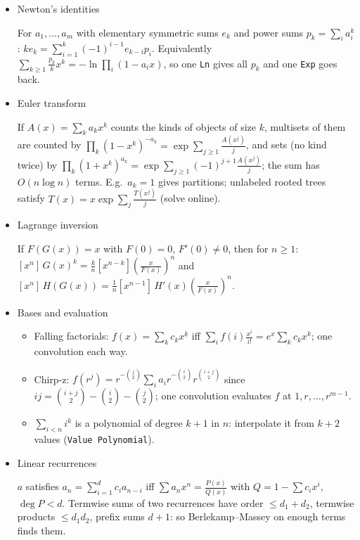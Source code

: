 \begin{itemize}
\item Newton's identities

For $a_1, \ldots, a_m$ with elementary symmetric sums $e_k$ and power sums $p_k = \sum_i a_i^k$: $k e_k = \sum_{i=1}^{k} (-1)^{i-1} e_{k-i} p_i$. Equivalently $\sum_{k \ge 1} \frac{p_k}{k} x^k = -\ln \prod_i (1 - a_i x)$, so one \texttt{Ln} gives all $p_k$ and one \texttt{Exp} goes back.

\item Euler transform

If $A(x) = \sum_k a_k x^k$ counts the kinds of objects of size $k$, multisets of them are counted by $\prod_k (1 - x^k)^{-a_k} = \exp \sum_{j \ge 1} \frac{A(x^j)}{j}$, and sets (no kind twice) by $\prod_k (1 + x^k)^{a_k} = \exp \sum_{j \ge 1} (-1)^{j+1} \frac{A(x^j)}{j}$; the sum has $O(n \log n)$ terms. E.g.\ $a_k = 1$ gives partitions; unlabeled rooted trees satisfy $T(x) = x \exp \sum_j \frac{T(x^j)}{j}$ (solve online).

\item Lagrange inversion

If $F(G(x)) = x$ with $F(0) = 0$, $F'(0) \ne 0$, then for $n \ge 1$: $[x^n]\, G(x)^k = \frac{k}{n} [x^{n-k}] \left(\frac{x}{F(x)}\right)^n$ and $[x^n]\, H(G(x)) = \frac 1 n [x^{n-1}]\, H'(x) \left(\frac{x}{F(x)}\right)^n$.

\item Bases and evaluation
\begin{itemize}
  \item Falling factorials: $f(x) = \sum_k c_k x^{\underline k}$ iff $\sum_i f(i) \frac{x^i}{i!} = e^x \sum_k c_k x^k$; one convolution each way.
  \item Chirp-z: $f(r^j) = r^{-\binom j 2} \sum_i a_i r^{-\binom i 2} r^{\binom{i+j}{2}}$ since $ij = \binom{i+j}{2} - \binom i 2 - \binom j 2$; one convolution evaluates $f$ at $1, r, \ldots, r^{m-1}$.
  \item $\sum_{i < n} i^k$ is a polynomial of degree $k + 1$ in $n$: interpolate it from $k + 2$ values (\texttt{Value Polynomial}).
\end{itemize}

\item Linear recurrences

$a$ satisfies $a_n = \sum_{i=1}^{d} c_i a_{n-i}$ iff $\sum a_n x^n = \frac{P(x)}{Q(x)}$ with $Q = 1 - \sum c_i x^i$, $\deg P < d$. Termwise sums of two recurrences have order $\le d_1 + d_2$, termwise products $\le d_1 d_2$, prefix sums $d + 1$: so Berlekamp–Massey on enough terms finds them.
\end{itemize}

